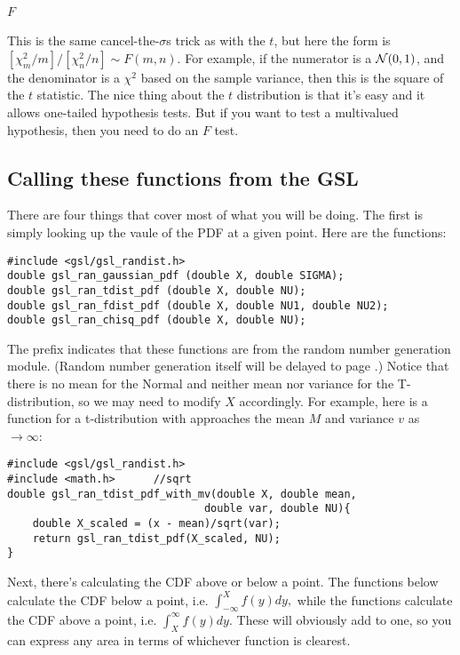 \paragraph{$F$}  This is the same cancel-the-$\sigma$s trick as with the $t$, but here the form
is $[\chi^2_m/m]/[\chi^2_n/n]\sim F(m,n)$. For example, if the numerator
is a ${\cal N}(0,1)$, and the denominator is a $\chi^2$ based on the
sample variance, then this is the square of the $t$ statistic.
The nice thing about the $t$ distribution is that it's easy and it
allows one-tailed hypothesis tests. But if you want to test a
multivalued hypothesis, then you need to do an $F$ test.

\subsection{Calling these functions from the GSL}
There are four things that cover most of what you will be doing. 
The first is simply looking up the vaule of the PDF at a given point. Here are the functions:
\begin{lstlisting}
#include <gsl/gsl_randist.h>
double gsl_ran_gaussian_pdf (double X, double SIGMA);
double gsl_ran_tdist_pdf (double X, double NU);
double gsl_ran_fdist_pdf (double X, double NU1, double NU2);
double gsl_ran_chisq_pdf (double X, double NU);
\end{lstlisting}
The prefix  indicates that these functions are from the
random number generation module. (Random number generation itself will be delayed to page
\pageref{randomnumbers}.) Notice that there is no mean for the Normal and neither mean nor variance
for the T-distribution, so we may need to modify $X$ accordingly. For
example, here is a function for a t-distribution with approaches the
mean $M$ and variance $v$ as $\to \infty$:
\begin{lstlisting}
#include <gsl/gsl_randist.h>
#include <math.h>      //sqrt
double gsl_ran_tdist_pdf_with_mv(double X, double mean,
                               double var, double NU){
    double X_scaled = (x - mean)/sqrt(var);
    return gsl_ran_tdist_pdf(X_scaled, NU);
}
\end{lstlisting}

Next, there's calculating the CDF above or below a point. 
The functions below calculate the CDF below a point, i.e.
$\int_{-\infty}^X f(y) dy,$
while the functions calculate the CDF above a point, i.e.
$\int^{\infty}_X f(y) dy.$
These will obviously add to one, so you can express any area in terms of whichever function is clearest.

